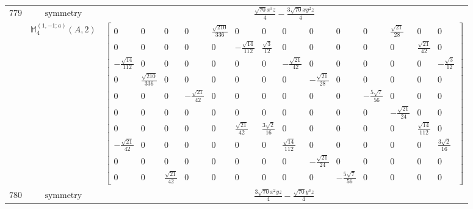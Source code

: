 \documentclass[fleqn,8pt,landscape]{jsarticle}
\begin{document}
\begin{longtable}{ccc}
$ 779 $ & $ \text{symmetry} $ & $ \frac{\sqrt{70} x^{3} z}{4} - \frac{3 \sqrt{70} x y^{2} z}{4} $ \\
$  $ & $ \mathbb{M}_{4}^{(1,-1;a)}(A,2) $ & $ \begin{bmatrix} 0 & 0 & 0 & 0 & \frac{\sqrt{210}}{336} & 0 & 0 & 0 & 0 & 0 & 0 & \frac{\sqrt{21}}{28} & 0 & 0 \\ 0 & 0 & 0 & 0 & 0 & - \frac{\sqrt{14}}{112} & \frac{\sqrt{3}}{12} & 0 & 0 & 0 & 0 & 0 & \frac{\sqrt{21}}{42} & 0 \\ - \frac{\sqrt{14}}{112} & 0 & 0 & 0 & 0 & 0 & 0 & - \frac{\sqrt{21}}{42} & 0 & 0 & 0 & 0 & 0 & - \frac{\sqrt{3}}{12} \\ 0 & \frac{\sqrt{210}}{336} & 0 & 0 & 0 & 0 & 0 & 0 & - \frac{\sqrt{21}}{28} & 0 & 0 & 0 & 0 & 0 \\ 0 & 0 & 0 & - \frac{\sqrt{21}}{42} & 0 & 0 & 0 & 0 & 0 & 0 & - \frac{5 \sqrt{7}}{56} & 0 & 0 & 0 \\ 0 & 0 & 0 & 0 & 0 & 0 & 0 & 0 & 0 & 0 & 0 & - \frac{\sqrt{21}}{24} & 0 & 0 \\ 0 & 0 & 0 & 0 & 0 & \frac{\sqrt{21}}{42} & \frac{3 \sqrt{2}}{16} & 0 & 0 & 0 & 0 & 0 & \frac{\sqrt{14}}{112} & 0 \\ - \frac{\sqrt{21}}{42} & 0 & 0 & 0 & 0 & 0 & 0 & \frac{\sqrt{14}}{112} & 0 & 0 & 0 & 0 & 0 & \frac{3 \sqrt{2}}{16} \\ 0 & 0 & 0 & 0 & 0 & 0 & 0 & 0 & - \frac{\sqrt{21}}{24} & 0 & 0 & 0 & 0 & 0 \\ 0 & 0 & \frac{\sqrt{21}}{42} & 0 & 0 & 0 & 0 & 0 & 0 & - \frac{5 \sqrt{7}}{56} & 0 & 0 & 0 & 0 \end{bmatrix} $ \\ \hline
$ 780 $ & $ \text{symmetry} $ & $ \frac{3 \sqrt{70} x^{2} y z}{4} - \frac{\sqrt{70} y^{3} z}{4} $ \\

\end{longtable}
\end{document}
